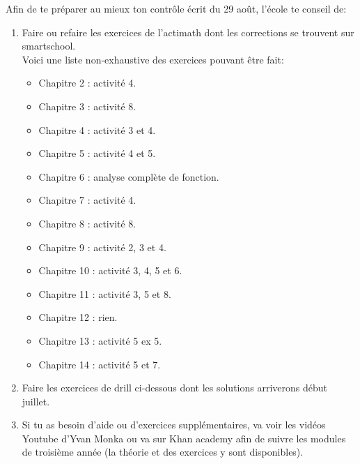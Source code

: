 \documentclass[a4paper, 12pt, parskip=half-]{scrartcl}
\begin{document}
Afin de te préparer au mieux ton contrôle écrit du 29 août, l'école te conseil de:
\begin{enumerate}
    \item Faire ou refaire les exercices de l'actimath dont les corrections se trouvent sur smartschool.\\
    Voici une liste non-exhaustive des exercices pouvant être fait:
    \begin{itemize}
        \item Chapitre 2 : activité 4.
        \item Chapitre 3 : activité 8.
        \item Chapitre 4 : activité 3 et 4.
        \item Chapitre 5 : activité 4 et 5.
        \item Chapitre 6 : analyse complète de fonction.
        \item Chapitre 7 : activité 4.
        \item Chapitre 8 : activité 8.
        \item Chapitre 9 : activité 2, 3 et 4.
        \item Chapitre 10 : activité 3, 4, 5 et 6.
        \item Chapitre 11 : activité 3, 5 et 8.
        \item Chapitre 12 : rien.
        \item Chapitre 13 : activité 5 ex 5.
        \item Chapitre 14 : activité 5 et 7.
    \end{itemize}
    \item Faire les exercices de drill ci-dessous dont les solutions arriverons début juillet.
    \item Si tu as besoin d'aide ou d'exercices supplémentaires, va voir les vidéos Youtube d'Yvan Monka ou va sur Khan academy afin de suivre les modules de troisième année (la théorie et des exercices y sont disponibles).
    \end{enumerate}
\newpage
\end{document}
